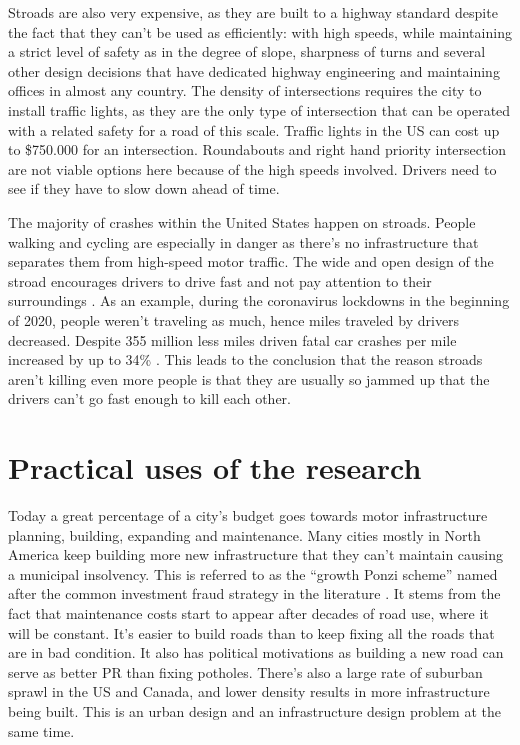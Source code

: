 \documentclass[
]{elteikthesis}[2023/04/10]
\begin{document}
Stroads are also very expensive, as they are built to a highway standard
despite the fact that they can't be used as efficiently: with high
speeds, while maintaining a strict level of safety as in the degree
of slope, sharpness of turns and several other design decisions that
have dedicated highway engineering and maintaining offices in almost
any country. The density of intersections requires the city to install
traffic lights, as they are the only type of intersection that can
be operated with a related safety for a road of this scale. Traffic
lights in the US can cost up to \$750.000 for an intersection. Roundabouts
and right hand priority intersection are not viable options here because
of the high speeds involved. Drivers need to see if they have to slow
down ahead of time.

The majority of crashes within the United States happen on stroads.
People walking and cycling are especially in danger as there's no
infrastructure that separates them from high-speed motor traffic.
The wide and open design of the stroad encourages drivers to drive
fast and not pay attention to their surroundings \cite{bates2015mixed}.
As an example, during the coronavirus lockdowns in the beginning of
2020, people weren't traveling as much, hence miles traveled by drivers
decreased. Despite 355 million less miles driven fatal car crashes
per mile increased by up to 34\% \cite{motorvehicle2020}. This leads
to the conclusion that the reason stroads aren't killing
even more people is that they are usually so jammed up
that the drivers can't go fast enough to kill each other.

\section{Practical uses of the research}

Today a great percentage of a city's budget goes towards motor infrastructure
planning, building, expanding and maintenance. Many cities mostly
in North America keep building more new infrastructure that they can't
maintain causing a municipal insolvency. This is referred to as the
``growth Ponzi scheme'' named after the common investment fraud
strategy in the literature \cite{marohn2019strong}. It stems from
the fact that maintenance costs start to appear after decades of road
use, where it will be constant. It's easier to build roads than to
keep fixing all the roads that are in bad condition. It also has political
motivations as building a new road can serve as better PR than fixing
potholes. There's also a large rate of suburban sprawl in the US and
Canada, and lower density results in more infrastructure being built.
This is an urban design and an infrastructure design problem at the
same time. 
\end{document}
